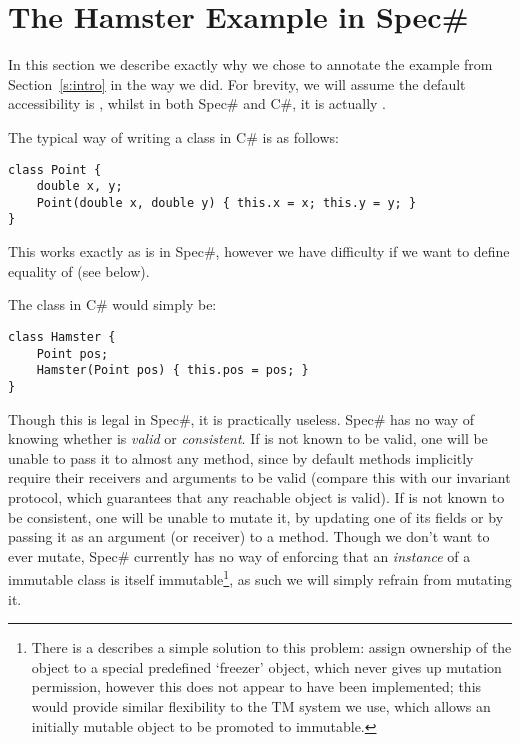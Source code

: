 \saveSpace
\section{The Hamster Example in Spec\#}\saveSpace
\label{s:hamster}

In this section we describe exactly why we chose to annotate the example from Section~\ref{s:intro} in the way we did. For brevity, we will assume the default accessibility is \Q@public@, whilst in both Spec\# and C\#, it is actually \Q@private@.

The typical way of writing a \Q@Point@ class in C\# is as follows:
\begin{lstlisting}
class Point {
	double x, y;
	Point(double x, double y) { this.x = x; this.y = y; }
}
\end{lstlisting}

This works exactly as is in Spec\#, however we have difficulty if we want to define equality of \Q@Point@s (see below).

The \Q@Hamster@ class in C\# would simply be:
\begin{lstlisting}
class Hamster {
	Point pos;
	Hamster(Point pos) { this.pos = pos; }
}
\end{lstlisting}

Though this is legal in Spec\#, it is practically useless. Spec\# has no way of knowing whether \Q@pos@ is \emph{valid} or \emph{consistent}. If \Q@pos@ is not known to be valid, one will be unable to pass it to almost any method, since by default methods implicitly require their receivers and arguments to be valid (compare this with our invariant protocol, which guarantees that any reachable object is valid).
If \Q@pos@ is not known to be consistent, one will be unable to mutate it, by updating one of its fields or by passing it as an argument (or receiver) to a \Q@Pure@ method.
Though we don't want \Q@pos@ to ever mutate, Spec\# currently has no way of enforcing that an \emph{instance} of a immutable class is itself immutable\footnote{There is a   describes a simple solution to this problem: assign ownership of the object to a special predefined `freezer' object, which never gives up mutation permission, however this does not appear to have been implemented; this would provide similar flexibility to the TM system we use, which allows an initially mutable object to be promoted to immutable.}, as such we will simply refrain from mutating it.

